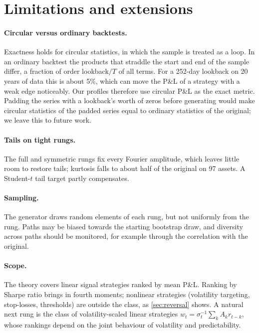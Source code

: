 \documentclass[11pt]{article}
\theoremstyle{definition}
\theoremstyle{remark}
\begin{document}
\section{Limitations and extensions}
\label{sec:limits}

\paragraph{Circular versus ordinary backtests.} Exactness holds for circular statistics, in which the sample is treated as a loop. In an ordinary backtest the products that
straddle the start and end of the sample differ, a fraction of order lookback$/T$ of all terms. For a 252-day lookback on 20 years of data this is about 5\%, which can move
the P\&L of a strategy with a weak edge noticeably. Our profiles therefore use circular P\&L as the exact metric. Padding the series with a lookback's worth of zeros before
generating would make circular statistics of the padded series equal to ordinary statistics of the original; we leave this to future work.

\paragraph{Tails on tight rungs.} The full and symmetric rungs fix every Fourier amplitude, which leaves little room to restore tails; kurtosis falls to about half of the
original on 97 assets. A Student-$t$ tail target partly compensates.

\paragraph{Sampling.} The generator draws random elements of each rung, but not uniformly from the rung. Paths may be biased towards the starting bootstrap draw, and
diversity across paths should be monitored, for example through the correlation with the original.

\paragraph{Scope.} The theory covers linear signal strategies ranked by mean P\&L. Ranking by Sharpe ratio brings in fourth moments; nonlinear strategies
(volatility targeting, stop-losses, thresholds) are outside the class, as \cref{sec:reversal} shows. A natural next rung is the class of volatility-scaled linear strategies
$w_t=\sigma_t^{-1}\sum_kA_kr_{t-k}$, whose rankings depend on the joint behaviour of volatility and predictability.
\end{document}
